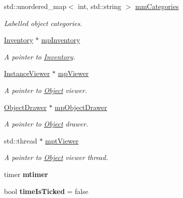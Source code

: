 \begin{DoxyCompactItemize}
\mbox{\label{classEngine_a1f29333d26ca0799ece0aad9a121108d}} 
std\+::unordered\+\_\+map$<$ int, std\+::string $>$ \hyperlink{classEngine_a1f29333d26ca0799ece0aad9a121108d}{mm\+Categories}
\begin{DoxyCompactList}\small\item\em Labelled object categories. \end{DoxyCompactList}\item 
\mbox{\label{classEngine_ab1a7b510fc78ce3e41afcce0492c8065}} 
\hyperlink{classInventory}{Inventory} $\ast$ \hyperlink{classEngine_ab1a7b510fc78ce3e41afcce0492c8065}{mp\+Inventory}
\begin{DoxyCompactList}\small\item\em A pointer to \hyperlink{classInventory}{Inventory}. \end{DoxyCompactList}\item 
\mbox{\label{classEngine_a344b73834a2105c834df216935af06e9}} 
\hyperlink{classInstanceViewer}{Instance\+Viewer} $\ast$ \hyperlink{classEngine_a344b73834a2105c834df216935af06e9}{mp\+Viewer}
\begin{DoxyCompactList}\small\item\em A pointer to \hyperlink{classObject}{Object} viewer. \end{DoxyCompactList}\item 
\mbox{\label{classEngine_ae0baa7948abc47c2a198bd70eacea10c}} 
\hyperlink{classObjectDrawer}{Object\+Drawer} $\ast$ \hyperlink{classEngine_ae0baa7948abc47c2a198bd70eacea10c}{mp\+Object\+Drawer}
\begin{DoxyCompactList}\small\item\em A pointer to \hyperlink{classObject}{Object} drawer. \end{DoxyCompactList}\item 
\mbox{\label{classEngine_ac18e97590b413588ec2e0d91b06f9f8c}} 
std\+::thread $\ast$ \hyperlink{classEngine_ac18e97590b413588ec2e0d91b06f9f8c}{mpt\+Viewer}
\begin{DoxyCompactList}\small\item\em A pointer to \hyperlink{classObject}{Object} viewer thread. \end{DoxyCompactList}\item 
\mbox{\label{classEngine_ad6aea740916785e00aa7f0bc7e73dbab}} 
timer {\bfseries mtimer}
\item 
\mbox{\label{classEngine_ae9d68b104f8ed664e4dfb058dd360e7b}} 
bool {\bfseries time\+Is\+Ticked} = false
\end{DoxyCompactItemize}


